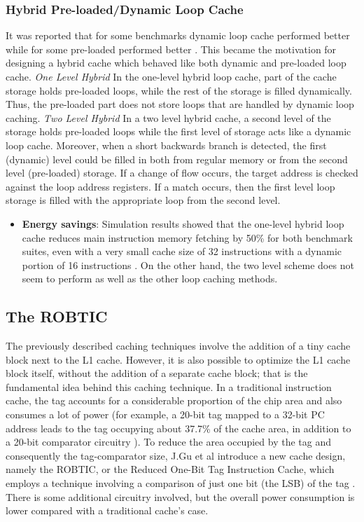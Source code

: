 \documentclass[conference]{IEEEtran}
\begin{document}
\subsubsection{Hybrid Pre-loaded/Dynamic Loop Cache }
It was reported that for some benchmarks dynamic loop cache performed better while for some pre-loaded performed better \cite{1}. This became the motivation for designing a hybrid cache which behaved like both dynamic and pre-loaded loop cache.\newline
\textit{One Level Hybrid}\newline
In the one-level hybrid loop cache, part of the cache storage holds pre-loaded loops, while the rest of the storage is filled dynamically. Thus, the pre-loaded part does not store loops that are handled by dynamic loop caching.\newline
\textit{Two Level Hybrid}\newline
In a two level hybrid cache, a second level of the storage holds pre-loaded loops while the first level of storage acts like a dynamic loop cache. Moreover, when a short backwards branch is detected, the first (dynamic) level could be filled in both from regular memory or from the second level (pre-loaded) storage. If a change of flow occurs, the target address is checked against the loop address registers. If a match occurs, then the first level loop storage is filled with the appropriate loop from the second level.
\begin{itemize}
    \item\textbf{Energy savings}: Simulation results showed that the one-level hybrid loop cache reduces main instruction memory fetching by 50\% for both benchmark suites, even with a very small cache size of 32 instructions with a dynamic portion of 16 instructions \cite{1}. On the other hand, the two level
scheme does not seem to perform as well as the other loop caching methods. \cite{1}
\end{itemize}

\subsection{The ROBTIC}

The previously described caching techniques involve the addition of a tiny cache block next to the L1 cache. However, it is also possible to optimize the L1 cache block itself, without the addition of a separate cache block; that is the fundamental idea behind this caching technique. In a traditional instruction cache, the tag accounts for a considerable proportion of the chip area and also consumes a lot of power (for example, a 20-bit tag mapped to a 32-bit PC address leads to the tag occupying about 37.7\% of the cache area, in addition to a 20-bit comparator circuitry \cite{robtic}). To reduce the area occupied by the tag and consequently the tag-comparator size, J.Gu et al \cite{robtic} introduce a new cache design, namely the ROBTIC, or the Reduced One-Bit Tag Instruction Cache, which employs a technique involving a comparison of just one bit (the LSB) of the tag \cite{robtic}. There is some additional circuitry involved, but the overall power consumption is lower compared with a traditional cache's case.
\end{document}
